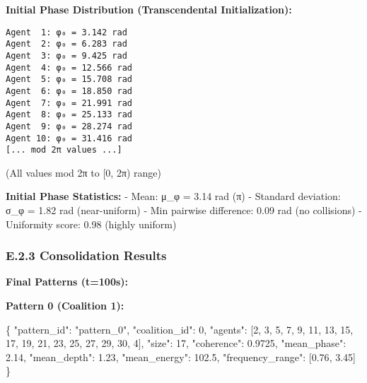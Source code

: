 \documentclass[
]{article}
\newenvironment{Shaded}{}{}
\newcommand{\DataTypeTok}[1]{\textcolor[rgb]{0.56,0.13,0.00}{#1}}
\newcommand{\DecValTok}[1]{\textcolor[rgb]{0.25,0.63,0.44}{#1}}
\newcommand{\FloatTok}[1]{\textcolor[rgb]{0.25,0.63,0.44}{#1}}
\newcommand{\FunctionTok}[1]{\textcolor[rgb]{0.02,0.16,0.49}{#1}}
\newcommand{\OtherTok}[1]{\textcolor[rgb]{0.00,0.44,0.13}{#1}}
\newcommand{\StringTok}[1]{\textcolor[rgb]{0.25,0.44,0.63}{#1}}
\begin{document}
\textbf{Initial Phase Distribution (Transcendental Initialization):}

\begin{verbatim}
Agent  1: φ₀ = 3.142 rad
Agent  2: φ₀ = 6.283 rad
Agent  3: φ₀ = 9.425 rad
Agent  4: φ₀ = 12.566 rad
Agent  5: φ₀ = 15.708 rad
Agent  6: φ₀ = 18.850 rad
Agent  7: φ₀ = 21.991 rad
Agent  8: φ₀ = 25.133 rad
Agent  9: φ₀ = 28.274 rad
Agent 10: φ₀ = 31.416 rad
[... mod 2π values ...]
\end{verbatim}

(All values mod 2π to {[}0, 2π) range)

\textbf{Initial Phase Statistics:} - Mean: μ\_φ = 3.14 rad (π) -
Standard deviation: σ\_φ = 1.82 rad (near-uniform) - Min pairwise
difference: 0.09 rad (no collisions) - Uniformity score: 0.98 (highly
uniform)

\subsubsection{E.2.3 Consolidation
Results}\label{e.2.3-consolidation-results}

\textbf{Final Patterns (t=100s):}

\textbf{Pattern 0 (Coalition 1):}

\begin{Shaded}
\begin{Highlighting}[]
\FunctionTok{\{}
  \DataTypeTok{"pattern\_id"}\FunctionTok{:} \StringTok{"pattern\_0"}\FunctionTok{,}
  \DataTypeTok{"coalition\_id"}\FunctionTok{:} \DecValTok{0}\FunctionTok{,}
  \DataTypeTok{"agents"}\FunctionTok{:} \OtherTok{[}\DecValTok{2}\OtherTok{,} \DecValTok{3}\OtherTok{,} \DecValTok{5}\OtherTok{,} \DecValTok{7}\OtherTok{,} \DecValTok{9}\OtherTok{,} \DecValTok{11}\OtherTok{,} \DecValTok{13}\OtherTok{,} \DecValTok{15}\OtherTok{,} \DecValTok{17}\OtherTok{,} \DecValTok{19}\OtherTok{,} \DecValTok{21}\OtherTok{,} \DecValTok{23}\OtherTok{,} \DecValTok{25}\OtherTok{,} \DecValTok{27}\OtherTok{,} \DecValTok{29}\OtherTok{,} \DecValTok{30}\OtherTok{,} \DecValTok{4}\OtherTok{]}\FunctionTok{,}
  \DataTypeTok{"size"}\FunctionTok{:} \DecValTok{17}\FunctionTok{,}
  \DataTypeTok{"coherence"}\FunctionTok{:} \FloatTok{0.9725}\FunctionTok{,}
  \DataTypeTok{"mean\_phase"}\FunctionTok{:} \FloatTok{2.14}\FunctionTok{,}
  \DataTypeTok{"mean\_depth"}\FunctionTok{:} \FloatTok{1.23}\FunctionTok{,}
  \DataTypeTok{"mean\_energy"}\FunctionTok{:} \FloatTok{102.5}\FunctionTok{,}
  \DataTypeTok{"frequency\_range"}\FunctionTok{:} \OtherTok{[}\FloatTok{0.76}\OtherTok{,} \FloatTok{3.45}\OtherTok{]}
\FunctionTok{\}}
\end{Highlighting}
\end{Shaded}
\end{document}
